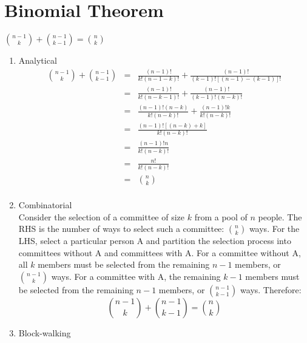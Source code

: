 \documentclass[letterpaper,12pt,fleqn]{article}
\begin{document}
\section*{Binomial Theorem}
\begin{theorem}
$\binom{n-1}{k}+\binom{n-1}{k-1}=\binom{n}{k}$
\end{theorem}
\begin{theproof}
\listbreak
\begin{enumerate}
\item{Analytical}
\begin{eqnarray*}
\binom{n-1}{k}+\binom{n-1}{k-1} &=& \frac{(n-1)!}{k!(n-1-k)!}+
  \frac{(n-1)!}{(k-1)![(n-1)-(k-1)]!} \\
    &=& \frac{(n-1)!}{k!(n-k-1)!}+\frac{(n-1)!}{(k-1)!(n-k)!} \\
    &=& \frac{(n-1)!(n-k)}{k!(n-k)!}+\frac{(n-1)!k}{k!(n-k)!} \\
    &=& \frac{(n-1)![(n-k)+k]}{k!(n-k)!} \\
    &=& \frac{(n-1)!n}{k!(n-k)!} \\
    &=& \frac{n!}{k!(n-k)!} \\
    &=& \binom{n}{k} \\
\end{eqnarray*}

\item{Combinatorial\vspace{0.25in} \\}
Consider the selection of a committee of size $k$ from a pool of $n$ people.
The RHS is the number of ways to select such a committee: $\binom{n}{k}$ ways.
For the LHS, select a particular person A and partition the selection process
into committees without A and committees with A.  For a committee without A,
all $k$ members must be selected from the remaining $n-1$ members, or
$\binom{n-1}{k}$ ways. For a committee with A, the remaining $k-1$ members must
be selected from the remaining $n-1$ members, or $\binom{n-1}{k-1}$ ways.
Therefore:
\[\binom{n-1}{k}+\binom{n-1}{k-1}=\binom{n}{k}\]

\item{Block-walking\vspace{0.25in} \\}
\end{enumerate}
\end{theproof}
\end{document}
